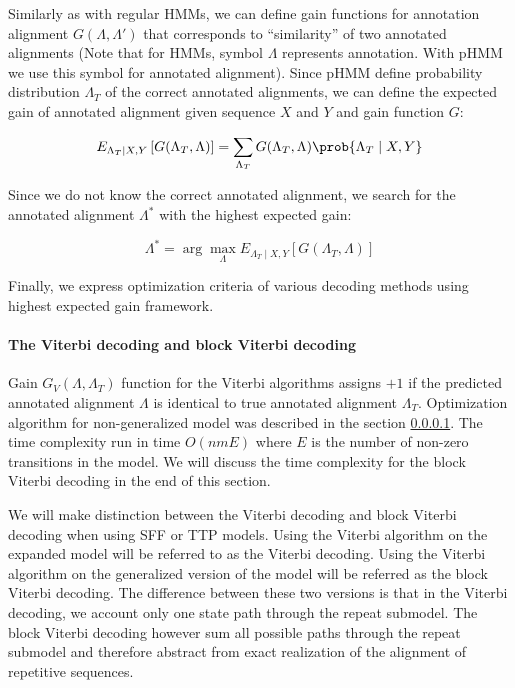 Similarly as with regular HMMs, we can define gain functions for annotation
alignment $G(\Lambda, \Lambda')$ that corresponds to ``similarity'' of two
annotated alignments (Note that for HMMs, symbol $\Lambda$ represents
annotation. With pHMM we use this symbol for annotated alignment).  Since pHMM
define probability distribution $\Lambda_T$ of the correct annotated
alignments, we can define the expected gain of annotated alignment given
sequence $X$ and $Y$ and gain function $G$: 

\begin{equation}
E_{\Lambda_T\mid X, Y}\left[G(\Lambda_T, \Lambda)\right] = 
\sum_{\Lambda_T}G(\Lambda_T, \Lambda)\prob{\Lambda_T\mid X, Y}
\end{equation}

Since we do not know the correct annotated alignment, we search for the
annotated alignment $\Lambda^*$ with the highest expected gain:

\begin{equation}
\Lambda^* = \arg\max_{\Lambda}
E_{\Lambda_T\mid X, Y}\left[G(\Lambda_T, \Lambda)\right]
\end{equation}

Finally, we express optimization criteria of various decoding methods using
highest expected gain framework.

\paragraph{The Viterbi decoding and block Viterbi decoding} Gain $G_V(\Lambda,
\Lambda_T)$ function for the Viterbi algorithms assigns $+1$ if the predicted
annotated alignment $\Lambda$ is identical to true annotated alignment
$\Lambda_T$. Optimization algorithm for non-generalized model was described in
the section \ref{}.  The time complexity run in time $O(nmE)$ where $E$ is the
number of non-zero transitions in the model.  We will discuss the time
complexity for the block Viterbi decoding in the end of this section.

We will make distinction between the Viterbi decoding and block Viterbi
decoding when using SFF or TTP models. Using the Viterbi algorithm on the
expanded model will be referred to as the Viterbi decoding. Using the Viterbi
algorithm on the generalized version of the model will be referred as the block
Viterbi decoding. The difference between these two versions is that in the
Viterbi decoding, we account only one state path through the repeat submodel.
The block Viterbi decoding however sum all possible paths through the repeat
submodel and therefore abstract from exact realization of the alignment of
repetitive sequences.

